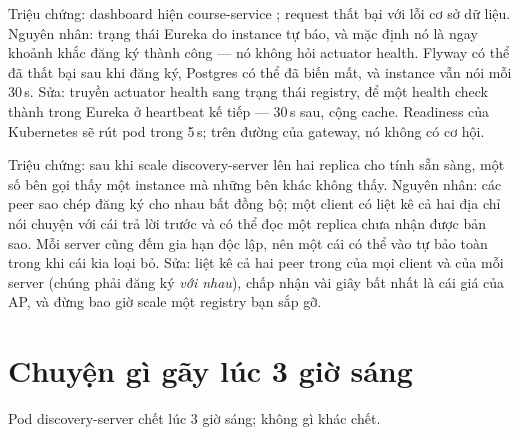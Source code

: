 \begin{pitfall}
Triệu chứng: dashboard hiện course-service ; request thất bại
với lỗi cơ sở dữ liệu. Nguyên nhân: trạng thái Eureka do instance tự
báo, và mặc định nó là  ngay khoảnh khắc đăng ký thành công
--- nó không hỏi actuator health. Flyway có thể đã thất bại sau khi
đăng ký, Postgres có thể đã biến mất, và instance vẫn nói  mỗi
30\,s. Sửa:  truyền
actuator health sang trạng thái registry, để một health check
 thành  trong Eureka ở heartbeat kế tiếp --- 30\,s
sau, cộng cache. Readiness của Kubernetes sẽ rút pod trong 5\,s; trên
đường của gateway, nó không có cơ hội.
\end{pitfall}

\begin{pitfall}
Triệu chứng: sau khi scale discovery-server lên hai replica cho tính
sẵn sàng, một số bên gọi thấy một instance mà những bên khác không
thấy. Nguyên nhân: các peer sao chép đăng ký cho nhau bất đồng bộ; một
client có  liệt kê cả hai địa chỉ nói chuyện với cái
trả lời trước và có thể đọc một replica chưa nhận được bản sao. Mỗi
server cũng đếm gia hạn độc lập, nên một cái có thể vào tự bảo toàn
trong khi cái kia loại bỏ. Sửa: liệt kê cả hai peer trong
 của mọi client và của mỗi server (chúng phải đăng ký
\emph{với nhau}), chấp nhận vài giây bất nhất là cái giá của AP, và
đừng bao giờ scale một registry bạn sắp gỡ.
\end{pitfall}

\section{Chuyện gì gãy lúc 3 giờ sáng}

Pod discovery-server chết lúc 3 giờ sáng; không gì khác chết.

